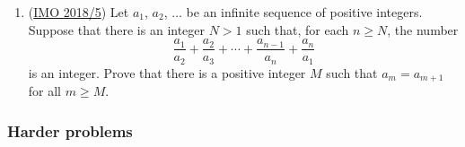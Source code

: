 \documentclass[11pt,paper=letter]{scrartcl}
\begin{document}
\begin{enumerate}[resume]
\item (\href{https://artofproblemsolving.com/community/c6h1671291p10632353}{IMO 2018/5}) Let $a_1$, $a_2$, $\ldots$ be an infinite sequence of positive integers. Suppose that there is an integer $N > 1$ such that, for each $n \geq N$, the number $$\frac{a_1}{a_2} + \frac{a_2}{a_3} + \cdots + \frac{a_{n-1}}{a_n} + \frac{a_n}{a_1}$$is an integer. Prove that there is a positive integer $M$ such that $a_m = a_{m+1}$ for all $m \geq M$. \hints{\ref{h:11-1} \ref{h:11-2} \ref{h:11-3}}

\end{enumerate}



\subsubsection*{Harder problems}
\end{document}
